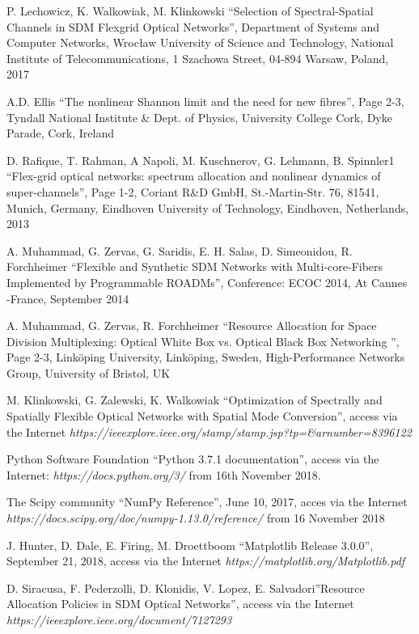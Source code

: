 \documentclass[conference]{IEEEtran}
\begin{document}
\begin{thebibliography}{00}

 P. Lechowicz, K. Walkowiak, M. Klinkowski ``Selection of Spectral-Spatial Channels in SDM
Flexgrid Optical Networks'', Department of Systems and Computer Networks, Wrocław University of Science and Technology, National Institute of Telecommunications, 1 Szachowa Street, 04-894 Warsaw, Poland, 2017

 A.D. Ellis ``The nonlinear Shannon limit and the need for new fibres'', Page 2-3, Tyndall National Institute \& Dept. of Physics, University College Cork, Dyke Parade, Cork, Ireland

 D. Rafique, T. Rahman, A Napoli, M. Kuschnerov, G. Lehmann, B. Spinnler1 ``Flex-grid optical networks: spectrum allocation and nonlinear dynamics of super-channels'', Page 1-2, Coriant R\&D GmbH, St.-Martin-Str. 76, 81541, Munich, Germany, Eindhoven University of Technology, Eindhoven, Netherlands, 2013

 A. Muhammad, G. Zervas, G. Saridis, E. H. Salas, D. Simeonidou, R. Forchheimer ``Flexible and Synthetic SDM Networks with Multi-core-Fibers Implemented by Programmable ROADMs'', Conference: ECOC 2014, At Cannes -France, September 2014

 A. Muhammad, G. Zervas, R. Forchheimer ``Resource Allocation for Space Division Multiplexing: Optical White Box vs. Optical Black Box Networking '', Page 2-3, Linköping University, Linköping, Sweden, High-Performance Networks Group, University of Bristol, UK

 M. Klinkowski, G. Zalewski, K. Walkowiak ``Optimization of Spectrally and Spatially Flexible Optical Networks with Spatial Mode Conversion'', access via the Internet \textit{https://ieeexplore.ieee.org/stamp/stamp.jsp?tp=\&arnumber=8396122}

 Python Software Foundation ``Python 3.7.1 documentation'', access via the Internet: \textit{https://docs.python.org/3/} from 16th November 2018.

 The Scipy community ``NumPy Reference'', June 10, 2017, acces via the Internet \textit{https://docs.scipy.org/doc/numpy-1.13.0/reference/} from 16 November 2018

 J. Hunter, D. Dale, E. Firing, M. Droettboom ``Matplotlib Release 3.0.0'', September 21, 2018, access via the Internet \textit{https://matplotlib.org/Matplotlib.pdf}

 D. Siracusa, F. Pederzolli, D. Klonidis, V. Lopez, E. Salvadori''Resource Allocation Policies in
SDM Optical Networks'', access via the Internet \textit{https://ieeexplore.ieee.org/document/7127293}

\end{thebibliography}
\vspace{12pt}
\end{document}
